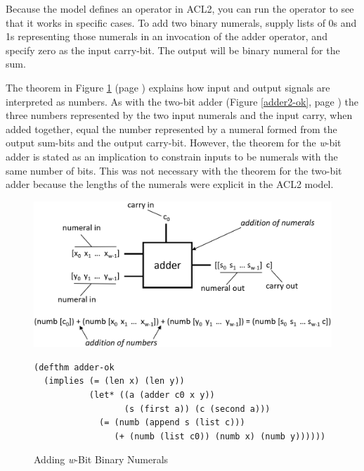Because the model defines an operator in ACL2,
you can run the operator to see that it works in specific cases.
To add two binary numerals, supply lists of 0s and 1s
representing those numerals in an invocation
of the \textsf{adder} operator, and specify zero as the input carry-bit.
The output will be binary numeral for the sum.

The theorem in Figure \ref{fig:adder-thm} (page \pageref{fig:adder-thm})
explains how input and output signals are interpreted as numbers.
As with the two-bit adder (Figure \ref{adder2-ok}, page \pageref{adder2-ok})
the three numbers represented by the two input
numerals and the input carry, when added together,
equal the number represented
by a numeral formed from the output sum-bits and
the output carry-bit.
However, the theorem for the \emph{w}-bit adder
is stated as an implication to constrain
inputs to be numerals with the same number of bits.
This was not necessary with the theorem for the two-bit adder
because the lengths of the numerals were explicit in the ACL2 model.

\begin{figure}
\begin{center}
\includegraphics[scale=0.3]{Images/adder-thm.png}
\begin{Verbatim}
(defthm adder-ok
  (implies (= (len x) (len y))
           (let* ((a (adder c0 x y))
                  (s (first a)) (c (second a)))
             (= (numb (append s (list c)))
                (+ (numb (list c0)) (numb x) (numb y))))))
\end{Verbatim}
\end{center}
\caption{Adding \emph{w}-Bit Binary Numerals}
\label{fig:adder-thm}
\end{figure}

